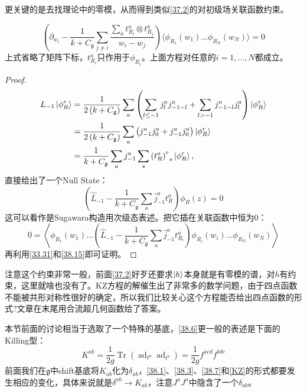 更关键的是去找理论中的零模，从而得到类似\ref{37.2}的对初级场关联函数约束。
\begin{theorem}
	\begin{equation}\label{KZ}
		\boxed{
			\left(\partial_{w_i}-\frac{1}{k+C_{\mathfrak{g}}}\sum_{j\neq i}\left.\frac{\sum_{a}t_{R_i}^{a}\otimes t_{R_j}^{a}}{w_i-w_j}\right)\big\langle\phi_{R_1}(w_1)\ldots\phi_{R_N}(w_N)\big\rangle=0\right.
		}
	\end{equation}
	上式省略了矩阵下标，$t^a_{R_i}$只作用于$\phi_{R_i}$。上面方程对任意的$i=1,\ldots,N$都成立。
\end{theorem}
\begin{proof}
	\begin{equation}
		\begin{aligned}
			L_{-1}\left|\phi_{R}^{r}\right\rangle & =\frac1{2\left(k+C_{\mathfrak{g}}\right)}\sum_a\left(\sum_{l\leq-1}j_l^aj_{-1-l}^a+\sum_{l>-1}j_{-1-l}^aj_l^a\right)\ket{\phi_R^r}  \\
			&=\frac1{2\left(k+C_{\mathfrak{g}}\right)}\sum_a\left(j_{-1}^aj_0^a+j_{-1}^a j_0^a\right)\ket{\phi_R^r}\\
			&=\frac1{k+C_{\mathfrak{g}}}\sum_aj_{-1}^a\sum_s{\left(t_R^a\right)^r}_s\ket{\phi_R^r},
		\end{aligned}
	\end{equation}
	直接给出了一个Null State：
	\begin{equation}
		\left(\widehat{L}_{-1}-\frac1{k+C_{\mathfrak{g}}}\sum_a\widehat{j}_{-1}^at_R^a\right)\phi_R(z)=0
	\end{equation}
	这可以看作是Sugawara构造用次级态表述。把它插在关联函数中恒为0：
	\begin{equation}
		0=\left\langle\phi_{R_1}(w_1)\ldots\left(\widehat{L}_{-1}-\frac1{k+C_{\mathfrak{g}}}\sum_a\widehat{j}_{-1}^at_{R_i}^a\right)\phi_{R_i}(w_i)\ldots\phi_{R_N}(w_N)\right\rangle 
	\end{equation}
	再利用\ref{33.31}和\ref{38.15}即可证明。
\end{proof}
注意这个约束非常一般，前面\ref{37.2}好歹还要求$\ket{h}$本身就是有零模的谱，对$h$有约束，这里就啥也没有了。KZ方程的解催生出了非常多的数学问题，由于四点函数不能被共形对称性很好的确定，所以我们比较关心这个方程能否给出四点函数的形式?文章\cite{Knizhnik:1984nr}在末尾用合流超几何函数给了答案。
\begin{remark}
	本节前面的讨论相当于选取了一个特殊的基底，\ref{38.6}更一般的表述是下面的Killing型：
	\begin{equation}
		K^{ab}=\frac1{2g}\operatorname{Tr}\left(\operatorname{ad}_{t^a}\operatorname{ad}_{t^b}\right)=\frac1{2g}f^{acd}f^{bdc}
	\end{equation}
	前面我们在$\mathfrak{g}$中shift基底将$K_{ab}$化为$\delta_{ab}$，\ref{38.1}、\ref{38.3}、\ref{38.7}和\ref{KZ}的形式都要发生相应的变化，具体来说就是$\delta^{ab}\to K_{ab}$，注意$J^aJ^a$中隐含了一个$\delta_{ab}$。
\end{remark}

